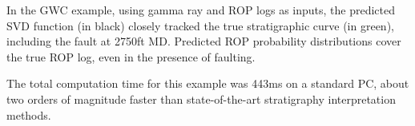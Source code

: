 %

In the GWC example, using gamma ray and ROP logs as inputs, the predicted SVD function (in black) closely tracked the true stratigraphic curve (in green), including the fault at 2750ft MD. Predicted ROP probability distributions cover the true ROP log, even in the presence of faulting.

The total computation time for this example was 443ms on a standard PC, about two orders of magnitude faster than state-of-the-art stratigraphy interpretation methods.